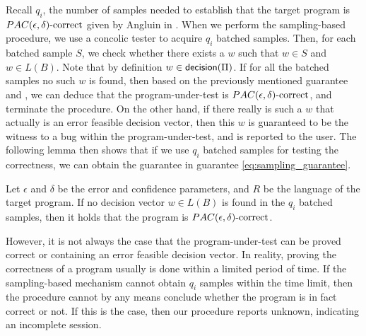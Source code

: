 Recall $q_i$, the number of samples needed to establish that the target program is $PAC(\epsilon, \delta)\text{-correct}$ given by Angluin in \cite{Angluin87}. When we perform the sampling-based procedure, we use a concolic tester to acquire $q_i$ batched samples. Then, for each batched sample $S$, we check whether there exists a $w$ such that $w \in S$ and $w \in L(B)$. Note that by definition $w \in \mathsf{decision}(\Pi)$. If for all the batched samples no such $w$ is found, then based on the previously mentioned guarantee and \cite{Angluin87}, we can deduce that the program-under-test is $PAC(\epsilon, \delta)\text{-correct}$, and terminate the procedure. On the other hand, if there really is such a $w$ that actually is an error feasible decision vector, then this $w$ is guaranteed to be the witness to a bug within the program-under-test, and is reported to the user. The following lemma then shows that if we use $q_i$ batched samples for testing the correctness, we can obtain the guarantee in guarantee \ref{eq:sampling_guarantee}.

\begin{lemma}
Let $\epsilon$ and $\delta$ be the error and confidence parameters, and $R$ be the language of the target program. If no decision vector $w \in L(B)$ is found in the $q_i$ batched samples, then it holds that the program is $PAC(\epsilon, \delta)\text{-correct}$.
\end{lemma}

However, it is not always the case that the program-under-test can be proved correct or containing an error feasible decision vector. In reality, proving the correctness of a program usually is done within a limited period of time. If the sampling-based mechanism cannot obtain $q_i$ samples within the time limit, then the procedure cannot by any means conclude whether the program is in fact correct or not. If this is the case, then our procedure reports unknown, indicating an incomplete session. 